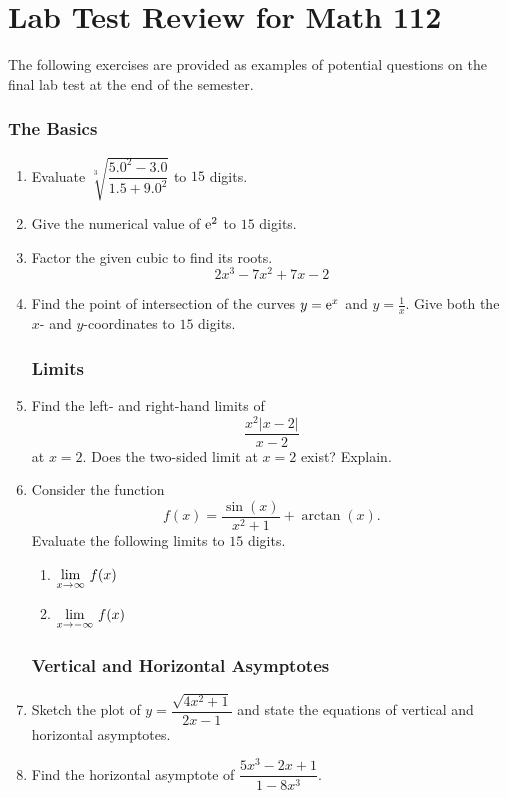 \chapter{Lab Test Review for Math 112}
\label{chp:lab_test_review_math_112}

The following exercises are provided as examples of potential questions on the final lab test at the end of the semester.

\subsection{The Basics}

\begin{enumerate}
\item Evaluate $\sqrt[3]{\dfrac{5.0^2 - 3.0}{1.5 + 9.0^2}}$ to $15$ digits.
\item Give the numerical value of ${\rm e}^2$ to $15$ digits.
\item Factor the given cubic to find its roots.\[ 2x^3 - 7x^2 + 7x -2 \]
\item Find the point of intersection of the curves $y = {\rm e}^x$ and $y = \frac{1}{x}$. Give both the $x$- and $y$-coordinates to $15$ digits.

\subsection{Limits}

\item Find the left- and right-hand limits of  \[ \dfrac{x^2 |x-2|}{x-2} \] at $x=2$. Does the two-sided limit at $x=2$ exist? Explain.
\item Consider the function \[ f(x)=\frac{\sin(x)}{x^2+1}+\arctan(x). \] Evaluate the following limits to $15$ digits.
	\begin{enumerate}
	\item $\displaystyle\lim_{x\rightarrow \infty}\, f(x)$
	\item $\displaystyle\lim_{x\rightarrow -\infty}\, f(x)$
	\end{enumerate}

\subsection{Vertical and Horizontal Asymptotes}

\item Sketch the plot of $y=\dfrac{ \sqrt{4x^2 + 1} }{2x - 1}$ and state the equations of vertical and horizontal asymptotes.
\item Find the horizontal asymptote of $\dfrac{5x^3 - 2x + 1}{1 - 8x^3}$.


\end{enumerate}
